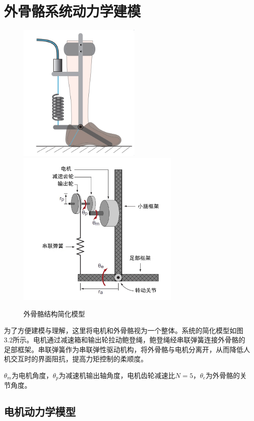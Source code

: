 \section{外骨骼系统动力学建模}

\begin{figure}[!htb]
    \label{fig:sub1}{\includegraphics[width=6cm]{fig/f50.jpg}}
    \label{fig:sub2}{\includegraphics[width=8cm]{fig/f49.png}}
    \caption{外骨骼结构简化模型}
    \label{fig:subfigss}
\end{figure}

为了方便建模与理解，这里将电机和外骨骼视为一个整体。系统的简化模型如图3.2所示。电机通过减速箱和输出轮拉动鲍登绳，鲍登绳经串联弹簧连接外骨骼的足部框架。串联弹簧作为串联弹性驱动机构，将外骨骼与电机分离开，从而降低人机交互时的界面阻抗，提高力矩控制的柔顺度。

$\theta_m$为电机角度，$\theta_p$为减速机输出轴角度，电机齿轮减速比$N=5$，$\theta_e$为外骨骼的关节角度。

\subsection{电机动力学模型}

